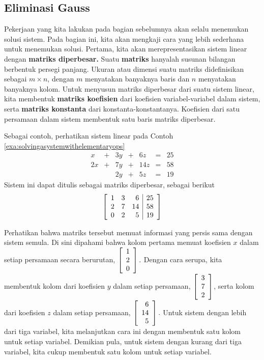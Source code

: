 \subsection{Eliminasi Gauss}

Pekerjaan yang kita lakukan pada bagian sebelumnya akan selalu menemukan solusi sistem. Pada bagian ini, kita akan mengkaji cara yang lebih sederhana untuk
menemukan solusi. Pertama, kita akan merepresentasikan sistem linear dengan \textbf{matriks diperbesar.} 
Suatu \textbf{matriks}  hanyalah susunan bilangan berbentuk persegi panjang. Ukuran atau dimensi suatu matriks  didefinisikan sebagai $m\times n$, dengan $m$ menyatakan
banyaknya baris dan $n$ menyatakan banyaknya kolom. Untuk menyusun matriks diperbesar
dari suatu sistem linear, kita membentuk \textbf{matriks koefisien} dari koefisien variabel-variabel dalam sistem, serta
\textbf{matriks konstanta} dari konstanta-konstantanya. Koefisien dari satu persamaan dalam sistem membentuk satu baris matriks diperbesar.

Sebagai contoh, perhatikan sistem linear pada Contoh \ref{exa:solvingasystemwithelementaryops}
\begin{equation*}
\begin{array}{ccccccc}
x&+&3y&+&6z&=&25 \\
2x&+&7y&+&14z&=&58 \\
&&2y&+&5z&=&19
\end{array}
\end{equation*}
Sistem ini dapat ditulis sebagai matriks diperbesar, sebagai berikut \:
\begin{equation*}
\left[ 
\begin{array}{rrr|r}
1 & 3 & 6 & 25 \\
2 & 7 & 14 & 58 \\
0 & 2 & 5 & 19
\end{array}
\right] 
\end{equation*}

Perhatikan bahwa matriks tersebut memuat informasi yang persis sama dengan sistem semula. Di sini dipahami
bahwa kolom pertama memuat koefisien $x$ dalam setiap persamaan secara berurutan,
$\left[
\begin{array}{r}
1 \\
2 \\
0
\end{array}
\right] .$ Dengan cara serupa, kita membentuk kolom dari koefisien $y$ dalam setiap persamaan, $\left[
\begin{array}{r}
3 \\
7 \\
2
\end{array}
\right] $, serta kolom dari koefisien $z$ dalam setiap persamaan, $\left[
\begin{array}{r}
6 \\
14 \\
5
\end{array}
\right] .$ Untuk sistem dengan lebih dari tiga variabel, kita melanjutkan cara ini dengan membentuk satu kolom untuk setiap variabel.
Demikian pula, untuk sistem dengan kurang dari tiga variabel, kita cukup membentuk satu kolom untuk setiap variabel.

